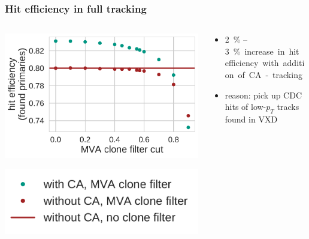 \documentclass[18pt, aspectratio=169]{beamer}
\begin{document}
\begin{frame}
  \frametitle{Hit efficiency in full tracking}
  
\begin{columns}
  \begin{column}{.5\textwidth}
    \centering
    \includegraphics[width=.7\textwidth]{figures/ca_hit_efficiency_matched_primaries_fullreco_trainedWithFakes.pdf}
    
    \includegraphics[width=.6\textwidth]{figures/legend_ca_fom_fullreco.pdf}
  \end{column}

  \begin{column}{.5\textwidth}
    \begin{itemize}
    \item \SI{2}{\percent} -- \SI{3}\percent increase in hit efficiency with addition of
      CA-tracking
      
    \item reason: pick up CDC hits of low-$p_T$ tracks found in VXD
    \end{itemize}
  \end{column}
\end{columns}    

  
\end{frame}
\end{document}
